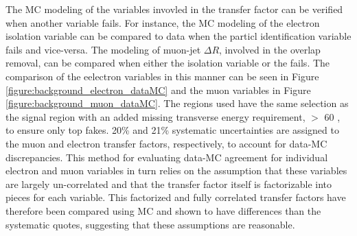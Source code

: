 The MC modeling of the variables invovled in the transfer factor can be verified when another variable fails. For instance, the MC modeling of the electron isolation variable can be compared to data when the particl identification variable fails and vice-versa. The modeling of muon-jet $\Delta R$, involved in the overlap removal, can be compared when either the isolation variable or the \pt fails. The comparison of the eelectron variables in this manner can be seen in Figure \ref{figure:background_electron_dataMC} and the muon variables in Figure \ref{figure:background_muon_dataMC}. The regions used have the same selection as the signal region with an added missing transverse energy requirement, $>$ 60 \gevc, to ensure only top fakes. 20\% and 21\% systematic uncertainties are assigned to the muon and electron transfer factors, respectively, to account for data-MC discrepancies. This method for evaluating data-MC agreement for individual electron and muon variables in turn relies on the assumption that these variables are largely un-correlated and that the transfer factor itself is factorizable into pieces for each variable. This factorized and fully correlated transfer factors have therefore been compared using MC and shown to have differences than the systematic quotes, suggesting that these assumptions are reasonable. 


